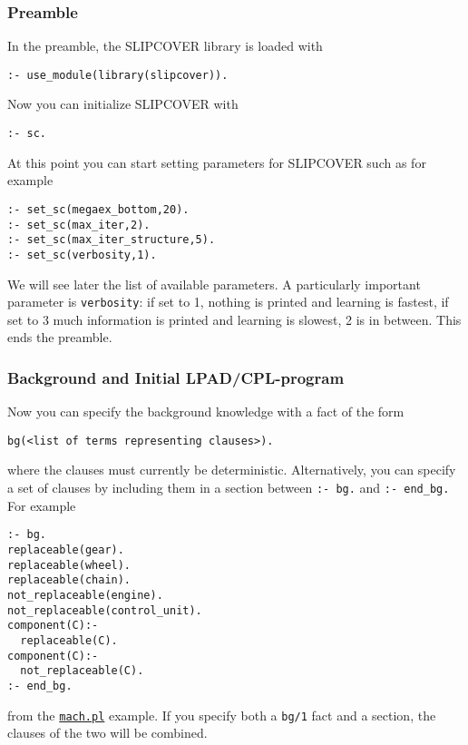 \subsubsection{Preamble}
In the preamble, the SLIPCOVER library is loaded with
\begin{verbatim}
:- use_module(library(slipcover)).
\end{verbatim}
Now you can initialize SLIPCOVER with
\begin{verbatim}
:- sc.
\end{verbatim}
At this point you can start setting parameters for SLIPCOVER such as for example
\begin{verbatim}
:- set_sc(megaex_bottom,20).
:- set_sc(max_iter,2).
:- set_sc(max_iter_structure,5).
:- set_sc(verbosity,1).
\end{verbatim}
We will see later the list of available parameters.
A particularly important parameter is \verb|verbosity|: if set
to 1, nothing is printed and learning is  fastest, if set to 3 much information is printed and learning is slowest, 2 is in between.
This ends the preamble.

\subsubsection{Background and Initial LPAD/CPL-program}
%
Now you can specify the background knowledge with a 
fact of the form 
\begin{verbatim}
bg(<list of terms representing clauses>).
\end{verbatim}
where the clauses must currently be deterministic.
Alternatively, you can specify a set of clauses by including them in 
a section between
\verb|:- bg.| and \verb|:- end_bg.| For example
\begin{verbatim}
:- bg.
replaceable(gear).
replaceable(wheel).
replaceable(chain).
not_replaceable(engine).
not_replaceable(control_unit).
component(C):-
  replaceable(C).
component(C):-
  not_replaceable(C).
:- end_bg.
\end{verbatim}
from the \href{http://cplint.lamping.unife.it/example/mach.pl}{\texttt{mach.pl}} example.
If you specify both a \verb|bg/1| fact and a section, the clauses of the two will be combined.


